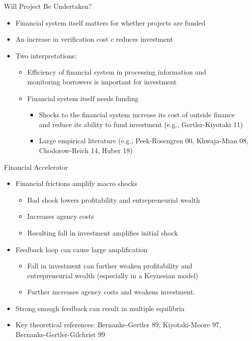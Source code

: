 \documentclass[11pt,aspectratio=169,xcolor={dvipsnames},hyperref={pdftex,pdfpagemode=UseNone,hidelinks,pdfdisplaydoctitle=true},usepdftitle=false]{beamer}
\begin{document}
\begin{frame}{Will Project Be Undertaken?}
\begin{itemize}
	\itemsep1em 
	\item Financial system itself matters for whether projects are funded
	\item An increase in verification cost $c$ reduces investment
	\item Two interpretations:
	\begin{itemize}
		\itemsep0.5em
		\item Efficiency of financial system in processing information and \\ monitoring borrowers is important for investment
		\item Financial system itself needs funding
		\begin{itemize}
			\item Shocks to the financial system increase its cost of outside finance \\ and reduce its ability to fund investment (e.g., Gertler-Kiyotaki 11)
			\item Large empirical literature (e.g., Peek-Rosengren 00,  Khwaja-Mian 08, Chodorow-Reich 14, Huber 18)
		\end{itemize}
	\end{itemize}
\end{itemize}
\end{frame}


\begin{frame}{Financial Accelerator}
\begin{itemize}
	\itemsep1em 
	\item Financial frictions amplify macro shocks
	\begin{itemize}
		\item Bad shock lowers profitability and entrepreneurial wealth
		\item Increases agency costs
		\item Resulting fall in investment amplifies initial shock
	\end{itemize}
	\item Feedback loop can cause large amplification
	\begin{itemize}
		\item Fall in investment can further weaken profitability and \\ entrepreneurial wealth (especially in a Keynesian model)
		\item Further increases agency costs and weakens investment.  
	\end{itemize}
	\item Strong enough feedback can result in multiple equilibria
	\item Key theoretical references: {\small Bernanke-Gertler 89, Kiyotaki-Moore 97, Bernanke-Gertler-Gilchrist 99}
\end{itemize}
\end{frame}
\end{document}
